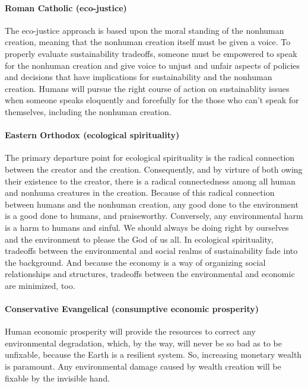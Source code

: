 \documentclass[12pt]{article}
\begin{document}
\paragraph{Roman Catholic (eco-justice)} 

The eco-justice approach is based upon the moral standing of the nonhuman creation,
meaning that the nonhuman creation itself must be given a voice. 
To properly evaluate sustainability tradeoffs,
someone must be empowered to speak for the nonhuman creation and 
give voice to unjust and unfair aspects of policies and decisions
that have implications for sustainability and the nonhuman creation.
Humans will pursue the right course of action on sustainablity issues
when someone speaks eloquently and forcefully for the 
those who can't speak for themselves, including the nonhuman creation. 

\paragraph{Eastern Orthodox (ecological spirituality)} 

The primary departure point for ecological spirituality is the radical connection between 
the creator and the creation.
Consequently, and by virture of both owing their existence to the creator, 
there is a radical connectedness among all human and nonhuma creatures in the creation.
Because of this radical connection between humans and the nonhuman creation, 
any good done to the environment is a good done to humans, 
and praiseworthy. 
Conversely, any environmental harm is a harm to humans and sinful. 
We should always be doing right by ourselves and the environment 
to please the God of us all.
In ecological spirituality, 
tradeoffs between the environmental and social realms of sustainability
fade into the background.
And because the economy is a way of organizing social relationships and structures,
tradeoffs between the environmental and economic are minimized, too.

\paragraph{Conservative Evangelical (consumptive economic prosperity)} 

Human economic prosperity will provide the resources 
to correct any environmental degradation, which, 
by the way, will never be so bad as to be unfixable, 
because the Earth is a resilient system. 
So, increasing monetary wealth is paramount. 
Any environmental damage caused by wealth creation will be fixable by the invisible hand. 
\end{document}
